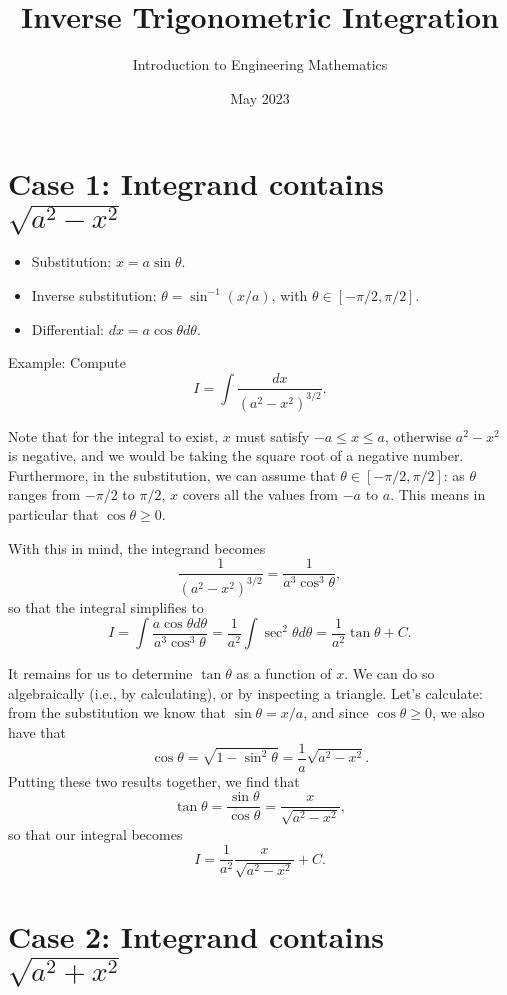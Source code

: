 \documentclass{article}
\title{Inverse Trigonometric Integration}
\author{Introduction to Engineering Mathematics}
\date{May 2023}
\begin{document}
\maketitle
\section*{Case 1: Integrand contains $\sqrt{a^2 - x^2}$}

\begin{itemize}
\item Substitution: $x = a \sin \theta$.
\item Inverse substitution: $\theta = \sin^{-1}(x/a)$, with $\theta \in [-\pi/2, \pi/2]$.
\item Differential: $dx = a \cos \theta d\theta$.
\end{itemize}

Example: Compute
\[
  I = \int\frac{dx}{(a^2 - x^2)^{3/2}}.
\]

Note that for the integral to exist, $x$ must satisfy $-a \le x \le a$, otherwise $a^2 - x^2$ is negative, and we would be taking the square root of a negative number. Furthermore, in the substitution, we can assume that $\theta \in [-\pi/2, \pi/2]$: as $\theta$ ranges from $-\pi/2$ to $\pi/2$, $x$ covers all the values from $-a$ to $a$. This means in particular that $\cos \theta \ge 0$.

With this in mind, the integrand becomes
\[
  \frac{1}{(a^2 - x^2)^{3/2}} = \frac{1}{a^3 \cos^3 \theta},
\]
so that the integral simplifies to
\[
  I = \int \frac{a \cos \theta d \theta}{a^3 \cos^3 \theta} = \frac{1}{a^2} \int \sec^2 \theta d \theta = \frac{1}{a^2} \tan \theta + C.
\]

It remains for us to determine $\tan \theta$ as a function of $x$. We can do so algebraically (i.e., by calculating), or by inspecting a triangle. Let's calculate: from the substitution we know that $\sin \theta = x/a$, and since $\cos \theta \ge 0$, we also have that
\[
  \cos \theta = \sqrt{1 - \sin^2 \theta} = \frac{1}{a} \sqrt{a^2 - x^2}.
\]
Putting these two results together, we find that
\[
  \tan \theta = \frac{\sin \theta}{\cos \theta} = \frac{x}{\sqrt{a^2 - x^2}},
\]
so that our integral becomes
\[
  I = \frac{1}{a^2} \frac{x}{\sqrt{a^2 - x^2}} + C.
\]

\section*{Case 2: Integrand contains $\sqrt{a^2 + x^2}$}
\end{document}
